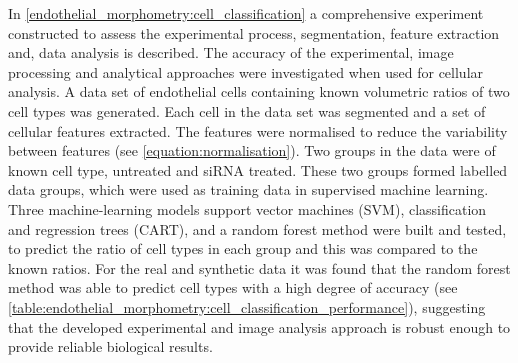 In \autoref{endothelial_morphometry:cell_classification} a comprehensive experiment constructed to assess the experimental process, segmentation, feature extraction and, data analysis is described. The accuracy of the experimental, image processing and analytical approaches were investigated when used for cellular analysis. A data set of endothelial cells containing known volumetric ratios of two cell types was generated. Each cell in the data set was segmented and a set of cellular features extracted. The features were normalised to reduce the variability between features (see \autoref{equation:normalisation}). Two groups in the data were of known cell type, untreated and siRNA treated. These two groups formed labelled data groups, which were used as training data in supervised machine learning. Three machine-learning models support vector machines (SVM), classification and regression trees (CART), and a random forest method were built and tested, to predict the ratio of cell types in each group and this was compared to the known ratios. For the real and synthetic data it was found that the random forest method was able to predict cell types with a high degree of accuracy (see \autoref{table:endothelial_morphometry:cell_classification_performance}), suggesting that the developed experimental and image analysis approach is robust enough to provide reliable biological results.
